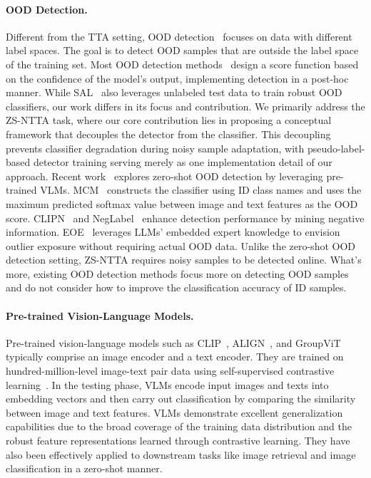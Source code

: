 \paragraph{OOD Detection.}
Different from the TTA setting, OOD detection~\citep{hendrycks17baseline, yang2022openood, yang2021generalized, fang2022out, du2022vos, huang2021mos, hendrycks2019anomalyseg, hendrycks2019oe, sehwag2021ssd} focuses on data with different label spaces. The goal is to detect OOD samples that are outside the label space of the training set. Most OOD detection methods~\citep{hendrycks17baseline, hendrycks2019scaling, liu2020energy, ming2022delving, jiang2024neglabel, esmaeilpour2022zero} design a score function based on the confidence of the model's output, implementing detection in a post-hoc manner. 
While SAL~\citep{du2024does} also leverages unlabeled test data to train robust OOD classifiers, our work differs in its focus and contribution. We primarily address the ZS-NTTA task, where our core contribution lies in proposing a conceptual framework that decouples the detector from the classifier. This decoupling prevents classifier degradation during noisy sample adaptation, with pseudo-label-based detector training serving merely as one implementation detail of our approach.
Recent work~\citep{ming2022delving, jiang2024neglabel, wang2023clipn, cao2024envisioning} explores zero-shot OOD detection by leveraging pre-trained VLMs.
MCM~\citep{ming2022delving} constructs the classifier using ID class names and uses the maximum predicted softmax value between image and text features as the OOD score. CLIPN~\citep{wang2023clipn} and NegLabel~\citep{jiang2024neglabel} enhance detection performance by mining negative information. EOE~\citep{cao2024envisioning} leverages LLMs' embedded expert knowledge to envision outlier exposure without requiring actual OOD data.
Unlike the zero-shot OOD detection setting, ZS-NTTA requires noisy samples to be detected online. What's more, existing OOD detection methods focus more on detecting OOD samples and do not consider how to improve the classification accuracy of ID samples.


\paragraph{Pre-trained Vision-Language Models.}
Pre-trained vision-language models such as CLIP~\citep{radford2021learning}, ALIGN~\citep{jia2021scaling}, and GroupViT~\citep{xu2022groupvit} typically comprise an image encoder and a text encoder. They are trained on hundred-million-level image-text pair data using self-supervised contrastive learning~\citep{chen2020simple}. In the testing phase, VLMs encode input images and texts into embedding vectors and then carry out classification by comparing the similarity between image and text features. VLMs demonstrate excellent generalization capabilities due to the broad coverage of the training data distribution and the robust feature representations learned through contrastive learning. They have also been effectively applied to downstream tasks like image retrieval and image classification in a zero-shot manner.